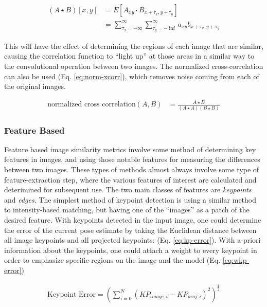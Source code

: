 \begin{equation}
    \begin{aligned}
        (A \star B)[x,y] &= E[A_{xy} \cdot B_{x + \tau_x,y+\tau_y}] \\
        &= \sum_{\tau_x=-\infty}^{\infty}\sum_{\tau_y=-\inf}^{\infty}a_{xy}b_{x + \tau_x,y + \tau_y}
    \end{aligned}
    \label{eq:xcorr}
\end{equation}

This will have the effect of determining the regions of each image that are similar, causing the correlation function to ``light up'' at those areas in a similar way to the convolutional operation between two images. The normalized cross-correlation can also be used (Eq. \ref{eq:norm-xcorr}), which removes noise coming from each of the original images.

\begin{equation}
    \begin{aligned}
        \text{normalized cross correlation}(A,B) &= \frac{A \star B}{(A \star A)(B \star B)}
    \end{aligned}\label{eq:norm-xcorr}
\end{equation}

\subsubsection{Feature Based}
\label{sec:img-sim-feature}
Feature based image similarity metrics involve some method of determining key features in images, and using those notable features for measuring the differences between two images. These types of methods almost always involve some type of feature-extraction step, where the various features of interest are calculated and deterimined for subsequent use. The two main classes of features are \emph{keypoints} and \emph{edges}. The simplest method of keypoint detection is using a similar method to intensity-based matching, but having one of the ``images'' as a patch of the desired feature. With keypoints detected in the input image, one could determine the error of the current pose estimate by taking the Euclidean distance between all image keypoints and all projected keypoints: \cite{burtonAutomaticTrackingHealthy2021} (Eq. \ref{eq:kp-error}). With a-priori information about the keypoints, one could attach a weight to every keypoint in order to emphasize specific regions on the image and the model (Eq. \ref{eq:wkp-error})

\begin{equation}
    \begin{aligned}
        \text{Keypoint Error}= (\sum_{i = 0}^{N}(KP_{image,i} - KP_{proj,i})^2)^{\frac{1}{2}}
    \end{aligned}
    \label{eq:kp-error}
\end{equation}

